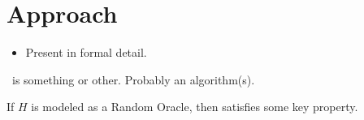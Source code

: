 \section{Approach}\label{sec:approach}

\begin{itemize}
  \item Present in formal detail.
\end{itemize}

\begin{construction}\label{cnstr:ourapproach}
  \ourapproach~is something or other.
  Probably an algorithm(s).
\end{construction}

\begin{theorem}\label{thm:key}
  If $H$ is modeled as a Random Oracle, then  satisfies some key property.
\end{theorem}
